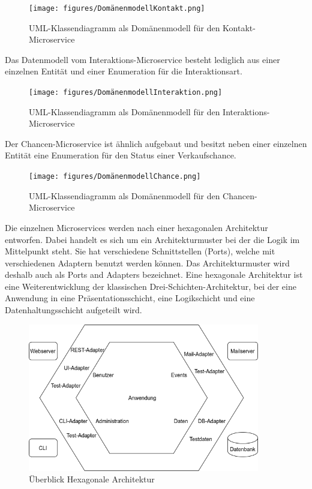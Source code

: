 \begin{figure}[H] 
    \centering
    \texttt{[image: figures/DomänenmodellKontakt.png]}
    \caption{UML-Klassendiagramm als Domänenmodell für den Kontakt-Microservice}
\end{figure} 

Das Datenmodell vom Interaktions-Microservice besteht lediglich aus einer einzelnen Entität und einer Enumeration für die Interaktionsart.

\begin{figure}[H] 
    \centering
    \texttt{[image: figures/DomänenmodellInteraktion.png]}
    \caption{UML-Klassendiagramm als Domänenmodell für den Interaktions-Microservice}
\end{figure}

Der Chancen-Microservice ist ähnlich aufgebaut und besitzt neben einer einzelnen Entität eine Enumeration für den Status einer Verkaufschance.

\begin{figure}[H] 
    \centering
    \texttt{[image: figures/DomänenmodellChance.png]}
    \caption{UML-Klassendiagramm als Domänenmodell für den Chancen-Microservice}
\end{figure}

Die einzelnen Microservices werden nach einer hexagonalen Architektur entworfen. Dabei handelt es sich um ein Architekturmuster bei der die Logik im Mittelpunkt steht. Sie hat verschiedene Schnittstellen (Ports), welche mit verschiedenen Adaptern benutzt werden können. Das Architekturmuster wird deshalb auch als Ports and Adapters bezeichnet. Eine hexagonale Architektur ist eine Weiterentwicklung der klassischen Drei-Schichten-Architektur, bei der eine Anwendung in eine Präsentationsschicht, eine Logikschicht und eine Datenhaltungsschicht aufgeteilt wird.

\begin{figure}[H] 
    \centering
    \includegraphics[width=0.9\textwidth]{figures/HexagonalDesignConcept.png}
    \caption{Überblick Hexagonale Architektur \parencite[vgl.][S. 204]{wolffMicroservices2018}}
\end{figure}

